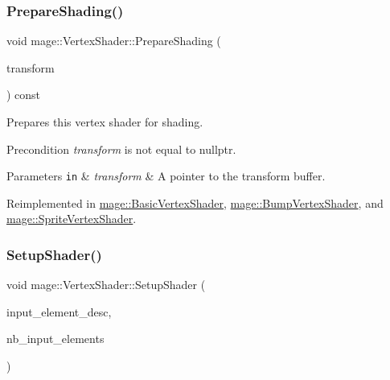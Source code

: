 \subsubsection{\texorpdfstring{Prepare\+Shading()}{PrepareShading()}}
{\footnotesize\ttfamily void mage\+::\+Vertex\+Shader\+::\+Prepare\+Shading (\begin{DoxyParamCaption}\item[{I\+D3\+D11\+Buffer $\ast$}]{transform }\end{DoxyParamCaption}) const\hspace{0.3cm}{\ttfamily [virtual]}}

Prepares this vertex shader for shading.

\begin{DoxyPrecond}{Precondition}
{\itshape transform} is not equal to {\ttfamily nullptr}. 
\end{DoxyPrecond}

\begin{DoxyParams}[1]{Parameters}
\mbox{\tt in}  & {\em transform} & A pointer to the transform buffer. \\
\hline
\end{DoxyParams}


Reimplemented in \hyperlink{classmage_1_1_basic_vertex_shader_ae565cb19b96591d5d1ff36ac0ff7344c}{mage\+::\+Basic\+Vertex\+Shader}, \hyperlink{classmage_1_1_bump_vertex_shader_a11513b06e76e8d3d55f6d96c5a14bdb7}{mage\+::\+Bump\+Vertex\+Shader}, and \hyperlink{classmage_1_1_sprite_vertex_shader_a10be47ca65f4baed735b5ffb52ee92bf}{mage\+::\+Sprite\+Vertex\+Shader}.

\hypertarget{classmage_1_1_vertex_shader_a3de0e623c3c4d81b580386fc13f85323}{}\label{classmage_1_1_vertex_shader_a3de0e623c3c4d81b580386fc13f85323} 
\subsubsection{\texorpdfstring{Setup\+Shader()}{SetupShader()}\hspace{0.1cm}{\footnotesize\ttfamily [1/2]}}
{\footnotesize\ttfamily void mage\+::\+Vertex\+Shader\+::\+Setup\+Shader (\begin{DoxyParamCaption}\item[{const D3\+D11\+\_\+\+I\+N\+P\+U\+T\+\_\+\+E\+L\+E\+M\+E\+N\+T\+\_\+\+D\+E\+SC $\ast$}]{input\+\_\+element\+\_\+desc,  }\item[{uint32\+\_\+t}]{nb\+\_\+input\+\_\+elements }\end{DoxyParamCaption})\hspace{0.3cm}{\ttfamily [private]}}

